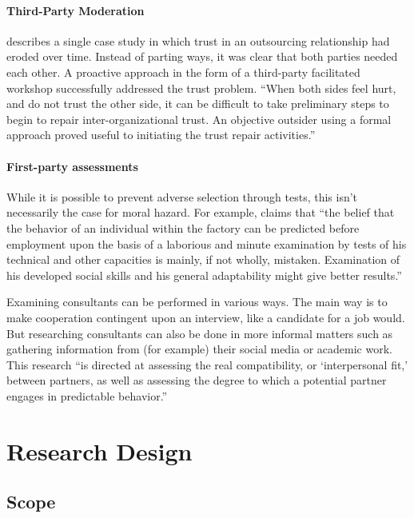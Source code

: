 \documentclass[12pt]{article}
\begin{document}
\paragraph{Third-Party Moderation}\label{third-party-moderation}

\citet[6-7]{babin2017} describes a single case study in which trust in
an outsourcing relationship had eroded over time. Instead of parting
ways, it was clear that both parties needed each other. A proactive
approach in the form of a third-party facilitated workshop successfully
addressed the trust problem. ``When both sides feel hurt, and do not
trust the other side, it can be difficult to take preliminary steps to
begin to repair inter-organizational trust. An objective outsider using
a formal approach proved useful to initiating the trust repair
activities.''

\paragraph{First-party assessments}\label{first-party-assessments}

While it is possible to prevent adverse selection through tests, this
isn't necessarily the case for moral hazard. For example,
\citet[111]{mayo1945} claims that ``the belief that the behavior of an
individual within the factory can be predicted before employment upon
the basis of a laborious and minute examination by tests of his
technical and other capacities is mainly, if not wholly, mistaken.
Examination of his developed social skills and his general adaptability
might give better results.''

Examining consultants can be performed in various ways. The main way is
to make cooperation contingent upon an interview, like a candidate for a
job would. But researching consultants can also be done in more informal
matters such as gathering information from (for example) their social
media or academic work. This research ``is directed at assessing the
real compatibility, or `interpersonal fit,' between partners, as well as
assessing the degree to which a potential partner engages in predictable
behavior.'' \citep[ 370]{shapiro1992}

\section{Research Design}\label{research-design}

\subsection{Scope}\label{scope}
\end{document}
